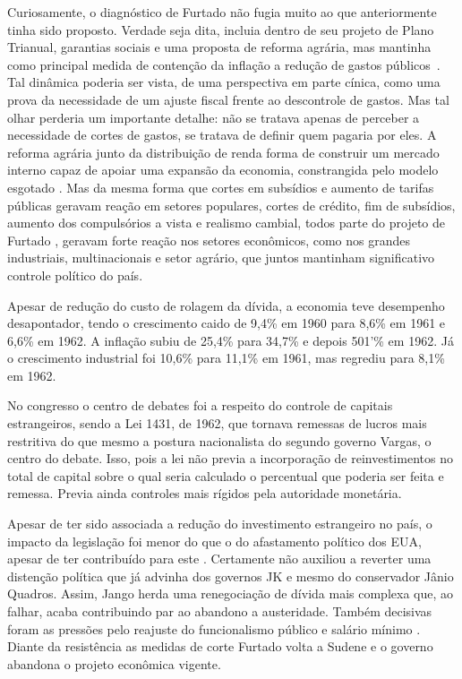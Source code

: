 Curiosamente, o diagnóstico de Furtado não fugia muito ao que anteriormente
tinha sido proposto. Verdade seja dita, incluia dentro de seu projeto de
Plano Trianual, garantias sociais e uma proposta de reforma agrária, mas mantinha
como principal medida de contenção da inflação a redução de gastos públicos~\citep{villela_dos_2025}.
Tal dinâmica poderia ser vista, de uma perspectiva em parte cínica, como uma prova da necessidade de um
ajuste fiscal frente ao descontrole de gastos. Mas tal olhar perderia um importante detalhe:
não se tratava apenas de perceber a necessidade de cortes de gastos, se tratava de definir quem
pagaria por eles. A reforma agrária junto da distribuição de renda forma de construir um mercado interno capaz de
apoiar uma expansão da economia, constrangida pelo modelo esgotado \citep{villela_dos_2025}. Mas da mesma forma
que cortes em subsídios e aumento de tarifas públicas geravam reação em setores populares,
cortes de crédito, fim de subsídios, aumento dos compulsórios a vista e realismo cambial, todos parte do projeto
de Furtado \citep{villela_dos_2025}, geravam forte reação nos setores econômicos, como nos grandes industriais,
multinacionais e setor agrário, que juntos mantinham significativo controle político do país.

Apesar de redução do custo de rolagem da dívida, a economia teve
desempenho desapontador, tendo o crescimento caido de 9,4\% em 1960 para
8,6\% em 1961 e 6,6\% em 1962. A inflação subiu de 25,4\% para 34,7\% e
depois 501'\% em 1962. Já o crescimento industrial foi 10,6\% para
11,1\% em 1961, mas regrediu para 8,1\% em 1962. \citep{mesquita_inflacao_2014}

No congresso o centro de debates foi a respeito do controle de capitais
estrangeiros, sendo a Lei 1431, de 1962, que tornava remessas de lucros mais restritiva do que
mesmo a postura nacionalista do segundo governo Vargas, o centro do debate.
Isso, pois a lei não previa a incorporação de reinvestimentos no total de capital sobre o qual
seria calculado o percentual que poderia ser feita e remessa. Previa ainda
controles mais rígidos pela autoridade monetária.

Apesar de ter sido associada a redução do investimento estrangeiro no país, o impacto
da legislação foi menor do que o do afastamento político
dos EUA, apesar de ter contribuído para este \citep{mesquita_inflacao_2014}. Certamente não
auxiliou a reverter uma distenção política que já advinha dos governos JK e mesmo do conservador
Jânio Quadros. Assim, Jango herda uma renegociação de dívida mais complexa que, ao falhar, acaba
contribuindo par ao abandono a austeridade. Também decisivas foram as pressões pelo reajuste do
funcionalismo público e salário mínimo \cite{villela_dos_2025}. Diante da resistência as medidas
de corte Furtado volta a Sudene e o governo abandona o projeto econômica vigente.

